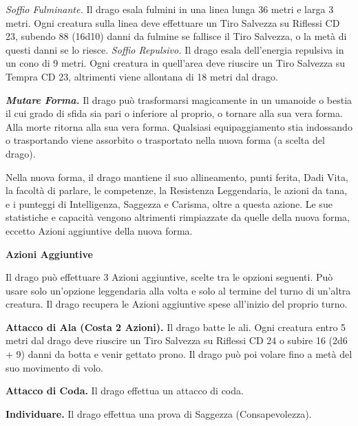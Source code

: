 \begin{multicols}{2}
\emph{Soffio Fulminante.} Il drago esala fulmini in una linea lunga 36 metri e larga 3 metri. Ogni creatura sulla linea deve effettuare un Tiro Salvezza su Riflessi CD 23, subendo 88 (16d10) danni da fulmine se fallisce il Tiro Salvezza, o la metà di questi danni se lo riesce. \emph{Soffio Repulsivo.} Il drago esala dell'energia repulsiva in un cono di 9 metri. Ogni creatura in quell'area deve riuscire un Tiro Salvezza su Tempra CD 23, altrimenti viene allontana di 18 metri dal
drago.

\emph{\textbf{Mutare Forma.}} Il drago può trasformarsi magicamente in un umanoide o bestia il cui grado di sfida sia pari o inferiore al proprio, o tornare alla sua vera forma. Alla morte ritorna alla sua vera forma. Qualsiasi equipaggiamento stia indossando o trasportando viene assorbito o trasportato nella nuova forma (a scelta del drago).

Nella nuova forma, il drago mantiene il suo allineamento, punti ferita, Dadi Vita, la facoltà di parlare, le competenze, la Resistenza Leggendaria, le azioni da tana, e i punteggi di Intelligenza, Saggezza e Carisma, oltre a questa azione. Le sue statistiche e capacità vengono altrimenti rimpiazzate da quelle della nuova forma, eccetto Azioni aggiuntive della nuova forma.

\textbf{Azioni Aggiuntive}

Il drago può effettuare 3 Azioni aggiuntive, scelte tra le opzioni seguenti. Può usare solo un'opzione leggendaria alla volta e solo al termine del turno di un'altra creatura. Il drago recupera le Azioni aggiuntive spese all'inizio del proprio turno.

\textbf{Attacco di Ala (Costa 2 Azioni).} Il drago batte le ali. Ogni creatura entro 5 metri dal drago deve riuscire un Tiro Salvezza su Riflessi CD 24 o subire 16 (2d6 + 9) danni da botta e venir gettato prono. Il drago può poi volare fino a metà del suo movimento di volo.

\textbf{Attacco di Coda.} Il drago effettua un attacco di coda.

\textbf{Individuare.} Il drago effettua una prova di Saggezza (Consapevolezza).


\end{multicols}
